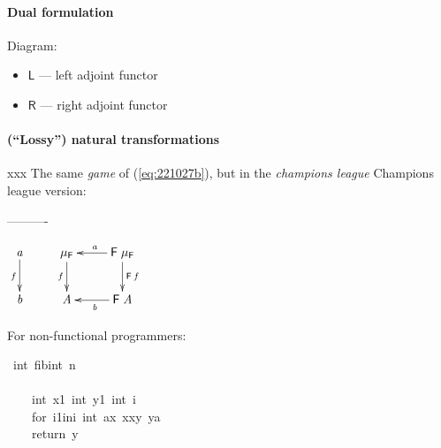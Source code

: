 \documentclass{elsarticle}
\newcommand{\Conid}[1]{\mathit{#1}}
\newcommand{\Varid}[1]{\mathit{#1}}
\def\fun#1{\mathsf{#1}}
\def\muF{\mu_{\fun F}}
\def\muF{\mu_{\fun F}}
\begin{document}
\paragraph{Dual formulation}

Diagram:

\begin{itemize}
\item	\ensuremath{\fun L } --- left adjoint functor
\item	\ensuremath{\fun R } --- right adjoint functor
\end{itemize}

\paragraph{(``Lossy'') natural transformations}
xxx The same \emph{game} of (\ref{eq:221027b}), but in the \emph{champions league}
Champions league version:

----------

\(
\xymatrix{
	\ensuremath{\Varid{a}}
 		\ar[d]_{\ensuremath{\Varid{f}}}
&
	\ensuremath{\muF }
 		\ar[d]_{\ensuremath{\Varid{f}}}
&
	\ensuremath{\fun F \;\muF }
 		\ar[l]_{\ensuremath{\Varid{a}}}
 		\ar[d]^{\ensuremath{\fun F \;\Varid{f}}}
\\
	\ensuremath{\Varid{b}}
&
	\ensuremath{\Conid{A}}
&
	\ensuremath{\fun F \;\Conid{A}}
 		\ar[l]^{\ensuremath{\Varid{b}}}
}
\)

For non-functional programmers: 
\begin{tabbing}\ttfamily
~int~fibint~n\\
\ttfamily ~\\
\ttfamily ~~~~int~x1~int~y1~int~i\\
\ttfamily ~~~~for~i1ini~int~ax~xxy~ya\\
\ttfamily ~~~~return~y\\
\ttfamily ~
\end{tabbing}
%

%
\end{document}
